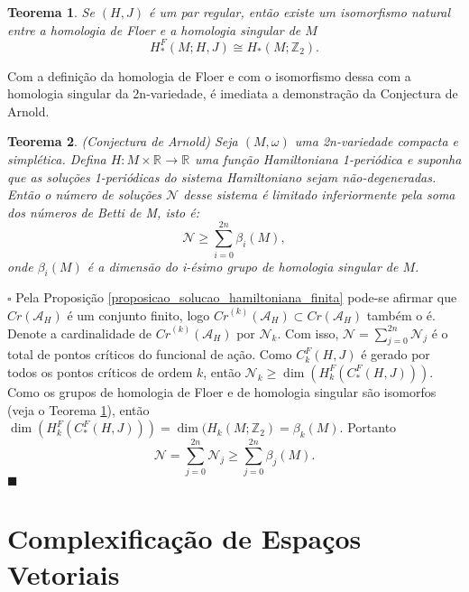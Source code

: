 \documentclass[12pt]{book}
\newtheorem{teorema}{Teorema}[section]
\newenvironment{prova}[1]{$\square$ #1}{\hfill$\blacksquare$}
\newcommand{\funcionalH}{\mathcal{A}_{H}}
\newcommand{\inteiros}{\mathbb{Z}}
\newcommand{\pontoscriticos}[1]{\textit{Cr}(#1)}
\newcommand{\pontoscriticosordem}[2]{\textit{Cr}^{(#1)}(#2)}
\newcommand{\real}[1]{\mathbb{R}^{#1}}
\newcommand{\reta}{\real{}}
\begin{document}
	\begin{teorema}\label{teorema_isomorfismo_homologia_floer}
		Se $(H,J)$ é um par regular, então 
		existe um isomorfismo natural entre a homologia de Floer e a homologia singular de $M$
		$$
		H^{F}_{*}(M;H,J) \cong H_{*}(M;\inteiros_{2}). 
		$$
		
	\end{teorema}
	
	Com a definição da homologia de Floer e com o isomorfismo dessa com a homologia singular da 2n-variedade, é imediata a demonstração da Conjectura de Arnold.
	
	\begin{teorema}
			(Conjectura de Arnold) Seja $(M,\omega)$ uma 2n-variedade compacta e simplética. Defina $H:M\times \real{} \to \reta$ uma função Hamiltoniana 1-periódica e suponha que as soluções 1-periódicas do sistema Hamiltoniano sejam não-degeneradas. Então o número de soluções $\mathcal{N}$ desse sistema é limitado inferiormente pela soma dos números de Betti de M, isto é:
				$$
				\mathcal{N}\geq \sum_{i=0}^{2n}\beta_{i}(M),
				$$
				onde $\beta_{i}(M)$ é a dimensão do i-ésimo grupo de homologia singular de $M$.
	\end{teorema}
	\begin{prova}
		Pela Proposição \ref{proposicao_solucao_hamiltoniana_finita} pode-se afirmar que $\pontoscriticos{\funcionalH}$ é um conjunto finito, logo $\pontoscriticosordem{k}{\funcionalH} \subset \pontoscriticos{\funcionalH}$ também o é. Denote a cardinalidade de $\pontoscriticosordem{k}{\funcionalH}$ por $\mathcal{N}_{k}$. Com isso, $\mathcal{N} =\sum_{j=0}^{2n} \mathcal{N}_{j}$ é o total de pontos críticos do funcional de ação. Como $C^{F}_{k}(H,J)$ é gerado por todos os pontos críticos de ordem $k$, então $\mathcal{N}_{k}\geq \dim(	H^{F}_{k}(C^{F}_{*}(H,J)))$. Como os grupos de homologia de Floer e de homologia singular são isomorfos (veja o Teorema \ref{teorema_isomorfismo_homologia_floer}), então $\dim(	H^{F}_{k}(C^{F}_{*}(H,J)))  = \dim(	H_{k}(M;\inteiros_{2}) = \beta_{k}(M)$. Portanto
		$$
		\mathcal{N} =\sum_{j=0}^{2n} \mathcal{N}_{j} \geq \sum_{j=0}^{2n} \beta_{j}(M).
		$$ 
	\end{prova}
	
	\appendix
	
	\chapter{Complexificação de Espaços Vetoriais}\label{apendice_complexificacao_espacos_vetoriais}
	
\end{document}
